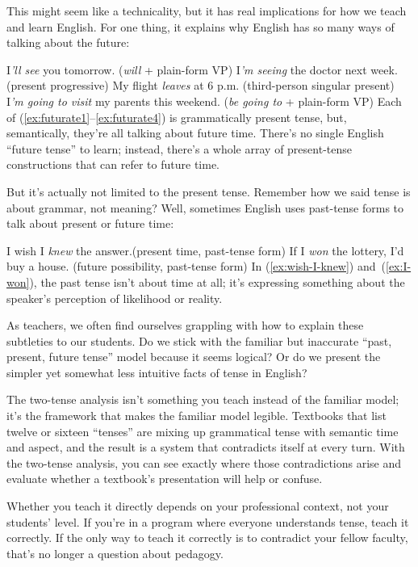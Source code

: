 This might seem like a technicality, but it has real implications for how we teach and learn English. For one thing, it explains why English has so many ways of talking about the future:

\ea\label{ex:futurate1} I\emph{'ll see} you tomorrow. \hfill(\emph{will} + plain-form VP)
\ex I\emph{'m seeing} the doctor next week. \hfill(present progressive)
\ex My flight \emph{leaves} at 6 p.m. \hfill(third-person singular present)
\ex\label{ex:futurate4} I\emph{'m going to visit} my parents this weekend. \hfill(\emph{be going to} + plain-form VP)
\z
Each of (\ref{ex:futurate1}--\ref{ex:futurate4}) is grammatically present tense, but, semantically, they're all talking about future time. There's no single English ``future tense'' to learn; instead, there's a whole array of present-tense constructions that can refer to future time.

But it's actually not limited to the present tense. Remember how we said tense is about grammar, not meaning? Well, sometimes English uses past-tense forms to talk about present or future time:

\ea\label{ex:wish-I-knew} I wish I \emph{knew} the answer.\hfill(present time, past-tense form)
\ex\label{ex:I-won} If I \emph{won} the lottery, I'd buy a house. \hfill(future possibility, past-tense form)
\z
In (\ref{ex:wish-I-knew}) and~(\ref{ex:I-won}), the past tense isn't about time at all; it's expressing something about the speaker's perception of likelihood or reality.

As teachers, we often find ourselves grappling with how to explain these subtleties to our students. Do we stick with the familiar but inaccurate \enquote{past, present, future tense} model because it seems logical? Or do we present the simpler yet somewhat less intuitive facts of tense in English?

The two-tense analysis isn't something you teach instead of the familiar model; it's the framework that makes the familiar model legible. Textbooks that list twelve or sixteen \enquote{tenses} are mixing up grammatical tense with semantic time and aspect, and the result is a system that contradicts itself at every turn. With the two-tense analysis, you can see exactly where those contradictions arise and evaluate whether a textbook's presentation will help or confuse.

Whether you teach it directly depends on your professional context, not your students' level. If you're in a program where everyone understands tense, teach it correctly. If the only way to teach it correctly is to contradict your fellow faculty, that's no longer a question about pedagogy.


